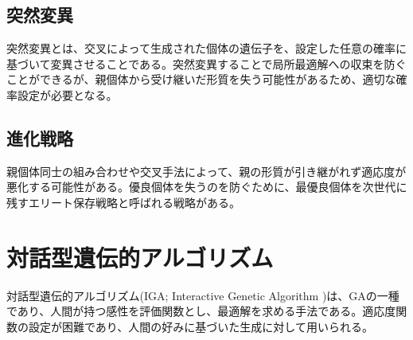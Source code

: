 \subsection{突然変異}
突然変異とは、交叉によって生成された個体の遺伝子を、設定した任意の確率に基づいて変異させることである。突然変異することで局所最適解への収束を防ぐことができるが、親個体から受け継いだ形質を失う可能性があるため、適切な確率設定が必要となる。
\subsection{進化戦略}
親個体同士の組み合わせや交叉手法によって、親の形質が引き継がれず適応度が悪化する可能性がある。優良個体を失うのを防ぐために、最優良個体を次世代に残すエリート保存戦略と呼ばれる戦略がある。

\section{対話型遺伝的アルゴリズム}
対話型遺伝的アルゴリズム(IGA; Interactive Genetic Algorithm )は、GAの一種であり、人間が持つ感性を評価関数とし、最適解を求める手法である。適応度関数の設定が困難であり、人間の好みに基づいた生成に対して用いられる。